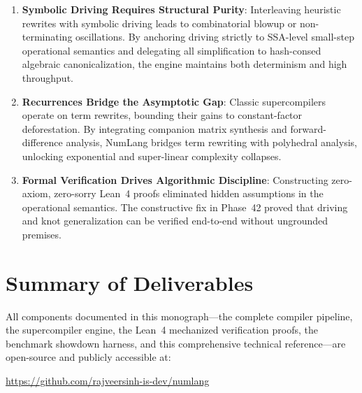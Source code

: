 \begin{enumerate}
    \item \textbf{Symbolic Driving Requires Structural Purity}: Interleaving heuristic rewrites with symbolic driving leads to combinatorial blowup or non-terminating oscillations. By anchoring driving strictly to SSA-level small-step operational semantics and delegating all simplification to hash-consed algebraic canonicalization, the engine maintains both determinism and high throughput.
    \item \textbf{Recurrences Bridge the Asymptotic Gap}: Classic supercompilers operate on term rewrites, bounding their gains to constant-factor deforestation. By integrating companion matrix synthesis and forward-difference analysis, NumLang bridges term rewriting with polyhedral analysis, unlocking exponential and super-linear complexity collapses.
    \item \textbf{Formal Verification Drives Algorithmic Discipline}: Constructing zero-axiom, zero-sorry Lean~4 proofs eliminated hidden assumptions in the operational semantics. The constructive fix in Phase~42 proved that driving and knot generalization can be verified end-to-end without ungrounded premises.
\end{enumerate}

\section{Summary of Deliverables}
\label{sec:conclusion:deliverables}

All components documented in this monograph---the complete compiler pipeline, the supercompiler engine, the Lean~4 mechanized verification proofs, the benchmark showdown harness, and this comprehensive technical reference---are open-source and publicly accessible at:
\begin{center}
\url{https://github.com/rajveersinh-is-dev/numlang}
\end{center}
